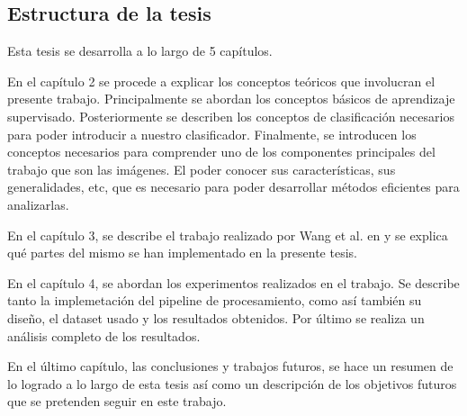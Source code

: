 \subsection{Estructura de la tesis}

	Esta tesis se desarrolla a lo largo de 5 capítulos.	
		
	En el capítulo 2 se procede a explicar los conceptos teóricos que involucran el presente trabajo. Principalmente se abordan los conceptos básicos de aprendizaje supervisado. Posteriormente se describen los conceptos de clasificación necesarios para poder introducir a nuestro clasificador. Finalmente, se introducen los conceptos necesarios para comprender uno de los componentes principales del trabajo que son las imágenes. El poder conocer sus características, sus generalidades, etc, que es necesario para poder desarrollar métodos eficientes para analizarlas.
	
	 En el capítulo 3, se describe el trabajo realizado por Wang et al. en \cite{wang} y se explica qué partes del mismo se han implementado en la presente tesis.

	En el capítulo 4, se abordan los experimentos realizados en el trabajo. Se describe tanto la implemetación del pipeline de procesamiento, como así también su diseño, el dataset usado y los resultados obtenidos. Por último se realiza un análisis completo de los resultados.
	
	En el último capítulo, las conclusiones y trabajos futuros, se hace un resumen de lo logrado a lo largo de esta tesis así como un descripción de los objetivos futuros que se pretenden seguir en este trabajo.
